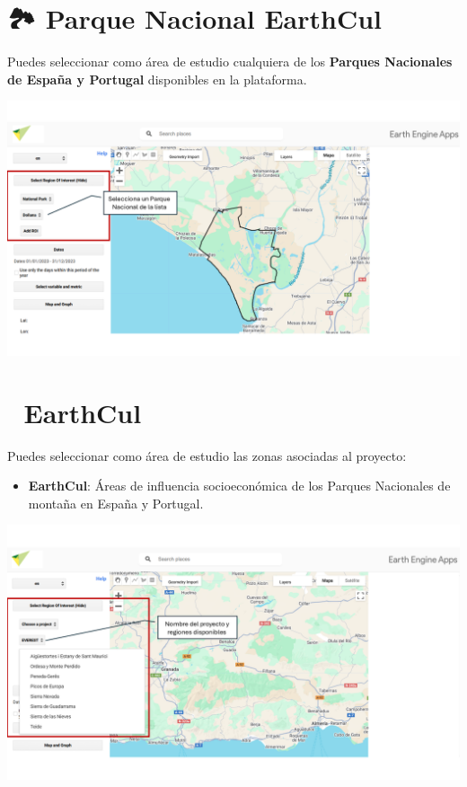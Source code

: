 \documentclass[
]{book}
\providecommand{\tightlist}{%
  \setlength{\itemsep}{0pt}\setlength{\parskip}{0pt}}
\begin{document}
\section{\texorpdfstring{\textbf{🏞️ Parque Nacional EarthCul}}{🏞️ Parque Nacional EarthCul}}\label{parque-nacional-earthcul}

Puedes seleccionar como área de estudio cualquiera de los \textbf{Parques Nacionales de España y Portugal} disponibles en la plataforma.

\includegraphics{assets/np_es.png}

\section{\texorpdfstring{\textbf{📁 EarthCul}}{📁 EarthCul}}\label{earthcul}

Puedes seleccionar como área de estudio las zonas asociadas al proyecto:

\begin{itemize}
\tightlist
\item
  \textbf{EarthCul}: Áreas de influencia socioeconómica de los Parques Nacionales de montaña en España y Portugal.
\end{itemize}

\includegraphics{assets/PROJECTS_es.png}
\end{document}

